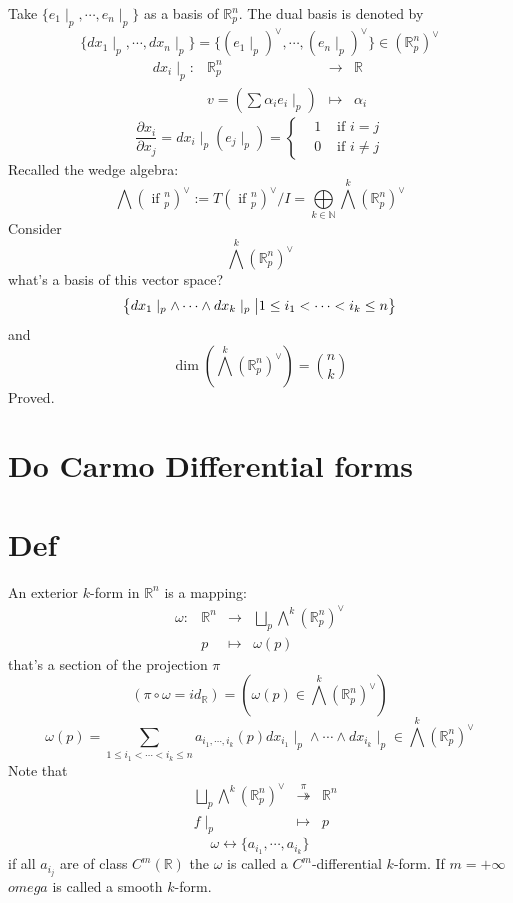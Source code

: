 \documentclass{book}
\begin{document}
Take $\{e_1\mid_p,\cdots,e_n\mid_p\}$ as a basis of $\mathbb{R}^n_p$. The dual basis is denoted by $$\{dx_1\mid_p,\cdots,dx_n\mid_p\}=\{(e_1\mid_p)^\vee,\cdots,(e_n\mid_p)^\vee\}\in (\mathbb{R}_p^n)^\vee$$
$$\begin{aligned}
    dx_i\mid_p: &\mathbb{R}^n_p &\rightarrow &\mathbb{R}\\
    &v=(\sum\alpha_ie_i\mid_p)&\mapsto &\alpha_i
\end{aligned}$$
$$\frac{\partial x_i}{\partial x_j}=dx_i\mid_p(e_j\mid_p)=\left\{\begin{aligned}
    &1&\text{ if }i=j\\
    &0&\text{ if }i\neq j
\end{aligned}\right.$$
Recalled the wedge algebra:
$$\bigwedge(\text{ if }^n_p)^\vee:=T(\text{ if }^n_p)^\vee/I=\bigoplus\limits_{k\in \mathbb{N}}\bigwedge\limits^k(\mathbb{R}_p^n)^\vee$$
Consider $$\bigwedge\limits^k(\mathbb{R}_p^n)^\vee$$
what's a basis of this vector space?
$$\left\{dx_1\mid_p\wedge\cdots\wedge dx_k\mid_p\textbf{\big|}1\leq i_1<\cdots< i_k\leq n\right\}$$
and $$\dim(\bigwedge\limits^k(\mathbb{R}_p^n)^\vee)={n\choose k}$$
Proved.
\section{Do Carmo Differential forms}
\section{Def}
An exterior $k$-form in $\mathbb{R}^n$ is a mapping:
$$\begin{aligned}
    \omega: &\mathbb{R}^n &\rightarrow &\bigsqcup\limits_{p}\bigwedge\limits^k(\mathbb{R}_p^n)^\vee\\
    &p&\mapsto&\omega(p)
\end{aligned}$$
that's a section of the projection $\pi$
$$(\pi\circ \omega=id_\mathbb{R})=(\omega(p)\in \bigwedge\limits^k(\mathbb{R}^n_p)^\vee)$$
$$\omega(p)=\sum\limits_{1\leq i_1<\cdots<i_k\leq n}a_{i_1,\cdots,i_k}(p)dx_{i_1}\mid_p\wedge\cdots\wedge dx_{i_k}\mid_p\in \bigwedge\limits^k(\mathbb{R}_p^n)^\vee$$
Note that
$$\begin{aligned}
    &\bigsqcup\limits_{p}\bigwedge\limits^k(\mathbb{R}_p^n)^\vee&\stackrel{\pi}{\twoheadrightarrow}&\mathbb{R}^n\\
    &f\mid_p&\mapsto&p 
\end{aligned}$$
$$\omega\leftrightarrow\{a_{i_1},\cdots,a_{i_k}\}$$
if all $a_{i_j}$ are of class $C^m(\mathbb{R})$ the $\omega$ is called a $C^m$-differential $k$-form. If $m=+\infty$ $omega$ is called a smooth $k$-form.
\end{document}

